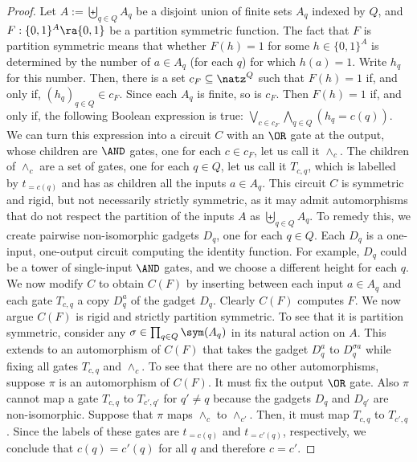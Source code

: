 \documentclass{toc}
\begin{document}
\begin{proof}
  Let $A := \biguplus_{q \in Q}A_q$ be a disjoint union of finite sets $A_q$
  indexed by $Q$, and $F : \{0, 1\}^A \ra \{0, 1\}$ be a partition symmetric
  function. The fact that $F$ is partition symmetric means that whether $F(h) =
  1$ for some $h \in \{0,1\}^A$ is determined by the number of $a \in A_q$ (for
  each $q$) for which $h(a) = 1$. Write $h_q$ for this number. Then, there is a
  set $c_F \subseteq \natz^Q$ such that $F(h) = 1$ if, and only if, $(h_q)_{q\in
    Q} \in c_F$. Since each $A_q$ is finite, so is $c_F$. Then $F(h) = 1$ if,
  and only if, the following Boolean expression is true: $\bigvee_{c \in
    c_F}\bigwedge_{q\in Q} (h_q = c(q)).$ We can turn this expression into a
  circuit $C$ with an $\OR$ gate at the output, whose children are $\AND$ gates,
  one for each $c \in c_F$, let us call it $\land_c$. The children of $\land_c$
  are a set of gates, one for each $q \in Q$, let us call it $T_{c,q}$, which is
  labelled by $t_{=c(q)}$ and has as children all the inputs $a \in A_q$.
  This circuit $C$ is symmetric and rigid, but not necessarily strictly
  symmetric, as it may admit automorphisms that do not respect the partition of
  the inputs $A$ as $\biguplus_{q \in Q}A_q$. To remedy this, we create pairwise
  non-isomorphic gadgets $D_q$, one for each $q \in Q$. Each $D_q$ is a
  one-input, one-output circuit computing the identity function. For example,
  $D_q$ could be a tower of single-input $\AND$ gates, and we choose a different
  height for each $q$. We now modify $C$ to obtain $C(F)$ by inserting between
  each input $a \in A_q$ and each gate $T_{c,q}$ a copy $D^a_q$ of the gadget
  $D_q$.
  Clearly $C(F)$ computes $F$. We now argue $C(F)$ is rigid and strictly partition
  symmetric. To see that it is partition symmetric, consider any $\sigma \in \prod_{q \in
    Q}\sym(A_q)$ in its natural action on $A$. This extends to an automorphism
  of $C(F)$ that takes the gadget $D^a_q$ to $D^{\sigma a}_q$ while fixing all
  gates $T_{c,q}$ and $\land_c$. To see that there are no other automorphisms,
  suppose $\pi$ is an automorphism of $C(F)$. It must fix the output $\OR$ gate.
  Also $\pi$ cannot map a gate $T_{c,q}$ to $T_{c',q'}$ for $q'\neq q$ because
  the gadgets $D_q$ and $D_{q'}$ are non-isomorphic. Suppose that $\pi$ maps
  $\land_c$ to $\land_{c'}$. Then, it must map $T_{c,q}$ to $T_{c',q}$. Since
  the labels of these gates are $t_{=c(q)}$ and $t_{=c'(q)}$, %
respectively, we
  conclude that $c(q) = c'(q)$ for all $q$ and therefore $c=c'$.
\end{proof}
\end{document}
